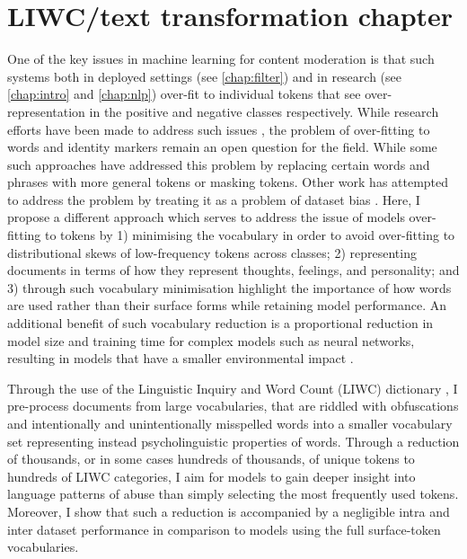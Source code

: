 \ifpdf
    \graphicspath{{Chapter4/Figs/Raster/}{Chapter4/Figs/PDF/}{Chapter4/Figs/}}
\else
    \graphicspath{{Chapter4/Figs/Vector/}{Chapter4/Figs/}}
\fi

\chapter{LIWC/text transformation chapter}\label{chap:liwc}

One of the key issues in machine learning for content moderation is that such systems both in deployed settings (see \cref{chap:filter}) and in research (see \cref{chap:intro} and \cref{chap:nlp}) over-fit to individual tokens that see over-representation in the positive and negative classes respectively. While research efforts have been made to address such issues \cite{CITE: cite papers that try to address overfitting}, the problem of over-fitting to words and identity markers remain an open question for the field. While some such approaches have addressed this problem by replacing certain words and phrases with more general tokens \cite{CITE: Replacing token papers} or masking \cite{CITE: Masking token paper} tokens. Other work has attempted to address the problem by treating it as a problem of dataset bias \cite{Dixon:2018}. Here, I propose a different approach which serves to address the issue of models over-fitting to tokens by 1) minimising the vocabulary in order to avoid over-fitting to distributional skews of low-frequency tokens across classes; 2) representing documents in terms of how they represent thoughts, feelings, and personality; and 3) through such vocabulary minimisation highlight the importance of how words are used rather than their surface forms while retaining model performance. An additional benefit of such vocabulary reduction is a proportional reduction in model size and training time for complex models such as neural networks, resulting in models that have a smaller environmental impact \citep{Strubell:2019}.

Through the use of the Linguistic Inquiry and Word Count (LIWC) dictionary \cite{LIWC:2015,Original LIWC Citation}, I pre-process documents from large vocabularies, that are riddled with obfuscations and intentionally and unintentionally misspelled words into a smaller vocabulary set representing instead psycholinguistic properties of words. Through a reduction of thousands, or in some cases hundreds of thousands, of unique tokens to hundreds of LIWC categories, I aim for models to gain deeper insight into language patterns of abuse than simply selecting the most frequently used tokens. Moreover, I show that such a reduction is accompanied by a negligible intra and inter dataset performance in comparison to models using the full surface-token vocabularies.

